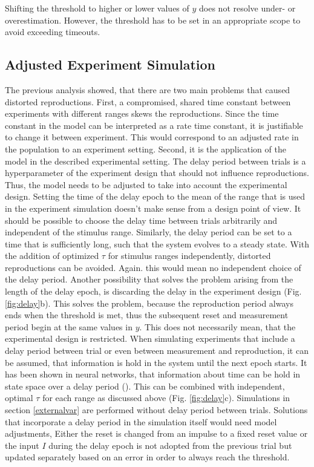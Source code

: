 \documentclass[10pt]{article}
\begin{document}
Shifting the threshold to higher or lower values of $y$ does not resolve under- or overestimation. However, the threshold has to be set in an appropriate scope to avoid exceeding timeouts. 

\subsection{Adjusted Experiment Simulation}
The previous analysis showed, that there are two main problems that caused distorted reproductions. 
First, a compromised, shared time constant between experiments with different ranges skews the reproductions.
Since the time constant in the model can be interpreted as a rate time constant, it is justifiable to change it between experiment. 
This would correspond to an adjusted rate in the population to an experiment setting.
Second, it is the application of the model in the described experimental setting. The delay period between trials is a hyperparameter of the experiment design that should not influence reproductions.
Thus, the model needs to be adjusted to take into account the experimental design. 
Setting the time of the delay epoch to the mean of the range that is used in the experiment simulation doesn't make sense from a design point of view. It should be possible to choose the delay time between trials arbitrarily and independent of the stimulus range. 
Similarly, the delay period can be set to a time that is sufficiently long, such that the system evolves to a steady state. With the addition of optimized $\tau$ for stimulus ranges independently, distorted reproductions can be avoided. Again. this would mean no independent choice of the delay period.
Another possibility that solves the problem arising from the length of the delay epoch, is discarding the delay in the experiment design (Fig. \ref{fig:delay}b).
This solves the problem, because the reproduction period always ends when the threshold is met, thus the subsequent reset and measurement period begin at the same values in $y$.  
This does not necessarily mean, that the experimental design is restricted. When simulating experiments that include a delay period between trial or even between measurement and reproduction, it can be assumed, that information is hold in the system until the next epoch starts. 
It has been shown in neural networks, that information about time can be hold in state space over a delay period (\cite{Bi2020}).
This can be combined with independent, optimal $\tau$ for each range as discussed above (Fig. \ref{fig:delay}c).
Simulations in section \ref{externalvar} are performed without delay period between trials.
Solutions that incorporate a delay period in the simulation itself would need model adjustments,
Either the reset is changed from an impulse to a fixed reset value or the input $I$ during the delay epoch is not adopted from the previous trial but updated separately based on an error in order to always reach the threshold. 
\end{document}
